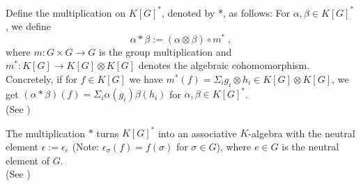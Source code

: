 
\begin{definition}
  Define the multiplication on $ K \left\lbrack G \right\rbrack^\ast $, denoted by $\ast$, as follows:  For $\alpha, \beta \in K \left\lbrack G \right\rbrack^\ast$, we define  
  \begin{equation*}
    \alpha \ast \beta := \left( \alpha \otimes \beta \right) \circ m^\ast \; ,
  \end{equation*}
  where $m \colon G\times G \rightarrow G$ is the group multiplication and $m^\ast \colon K[G] \rightarrow K[G]\otimes K[G]$ denotes the algebraic cohomomorphism.
  Concretely, if for $f \in K \left\lbrack G \right\rbrack$ we have $m^\ast \left( f \right) = \Sigma_i g_i \otimes h_i \in K[G] \otimes K[G]$, we get $\left( \alpha \ast \beta \right) \left( f \right) = \Sigma_i \alpha \left( g_i \right) \beta \left( h_i \right)$ for $\alpha,\beta \in K[G]^\ast$.  \\
  (See \cite[A.2.1]{DK15})
\end{definition}
%
%

\begin{proposition}
  The multiplication $\ast$ turns $K \left\lbrack G \right\rbrack^\ast$ into an associative $K$-algebra with the neutral element $ \epsilon := \epsilon_e$ (Note: $\epsilon_\sigma \left( f \right) = f \left( \sigma \right)$ for $\sigma \in G$), where $e \in G$ is the neutral element of $G$.\\
  (See \cite[A2.2]{DK15})
\end{proposition}

